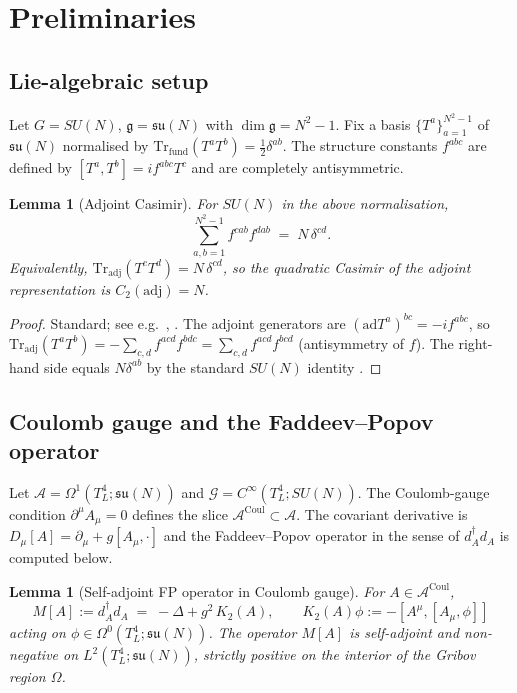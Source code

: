 \documentclass[11pt,a4paper]{amsart}
\newtheorem{lemma}[theorem]{Lemma}
\theoremstyle{definition}
\newcommand{\gfrak}{\mathfrak{g}}
\newcommand{\su}{\mathfrak{su}}
\newcommand{\Tr}{\mathrm{Tr}}
\newcommand{\ad}{\mathrm{ad}}
\newcommand{\Coul}{\mathrm{Coul}}
\begin{document}
\section{Preliminaries}\label{sec:prelim}

\subsection{Lie-algebraic setup}\label{ssec:Lie}

Let $G = SU(N)$, $\gfrak = \su(N)$ with $\dim \gfrak = N^2-1$. Fix a basis
$\{T^a\}_{a=1}^{N^2-1}$ of $\su(N)$ normalised by $\Tr_{\mathrm{fund}}(T^a T^b)
= \tfrac{1}{2}\delta^{ab}$. The structure constants $f^{abc}$ are defined by
$[T^a, T^b] = i f^{abc} T^c$ and are completely antisymmetric.

\begin{lemma}[Adjoint Casimir]\label{lem:casimir}
For $SU(N)$ in the above normalisation,
\[
\sum_{a,b=1}^{N^2-1} f^{cab} f^{dab} \;=\; N \, \delta^{cd}.
\]
Equivalently, $\Tr_{\mathrm{adj}}(T^c T^d) = N \, \delta^{cd}$, so the
quadratic Casimir of the adjoint representation is $C_2(\mathrm{adj}) = N$.
\end{lemma}

\begin{proof}
Standard; see e.g.\ \cite[Appendix~A]{PeskinSchroeder1995},
\cite[\S 33.3]{Slansky1981}. The adjoint generators are $(\ad T^a)^{bc}
= -if^{abc}$, so $\Tr_{\mathrm{adj}}(T^a T^b) = -\sum_{c,d} f^{acd}f^{bdc}
= \sum_{c,d} f^{acd} f^{bcd}$ (antisymmetry of $f$). The right-hand side
equals $N \delta^{ab}$ by the standard $SU(N)$ identity
\cite[Eq.~(A.117)]{PeskinSchroeder1995}.
\end{proof}

\subsection{Coulomb gauge and the Faddeev--Popov operator}\label{ssec:Coulomb}

Let $\mathcal A = \Omega^1(T^4_L; \su(N))$ and $\mathcal G = C^\infty(T^4_L; SU(N))$.
The Coulomb-gauge condition $\partial^\mu A_\mu = 0$ defines the slice
$\mathcal A^{\Coul} \subset \mathcal A$. The covariant derivative is
$D_\mu[A] = \partial_\mu + g[A_\mu, \cdot]$ and the Faddeev--Popov operator
in the sense of $d_A^\dagger d_A$ is computed below.

\begin{lemma}[Self-adjoint FP operator in Coulomb gauge]\label{lem:Mself}
For $A \in \mathcal A^{\Coul}$,
\begin{equation}\label{eq:M-explicit}
M[A] := d_A^\dagger d_A \;=\; -\Delta + g^2 \, K_2(A),
\qquad
K_2(A)\phi := -[A^\mu, [A_\mu, \phi]]
\end{equation}
acting on $\phi \in \Omega^0(T^4_L; \su(N))$. The operator $M[A]$ is
self-adjoint and non-negative on $L^2(T^4_L; \su(N))$, strictly positive on
the interior of the Gribov region $\Omega$.
\end{lemma}
\end{document}
